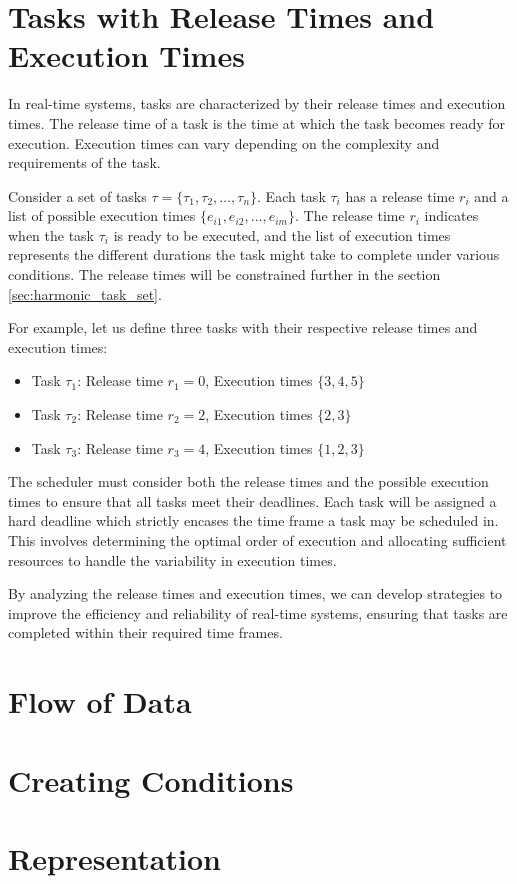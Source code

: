 \section{Tasks with Release Times and Execution Times}
\label{sec:tasks_release_execution}

In real-time systems, tasks are characterized by their release times and execution times.
The release time of a task is the time at which the task becomes ready for execution.
Execution times can vary depending on the complexity and requirements of the task.

Consider a set of tasks \( \tau = \{\tau_1, \tau_2, \ldots, \tau_n\} \).
Each task \( \tau_i \) has a release time \( r_i \) and a list of possible execution times \( \{e_{i1}, e_{i2}, \ldots, e_{im}\} \).
The release time \( r_i \) indicates when the task \( \tau_i \) is ready to be executed, and the list of execution times represents the different durations the task might take to complete under various conditions.
The release times will be constrained further in the section \cref{sec:harmonic_task_set}.

For example, let us define three tasks with their respective release times and execution times:

\begin{itemize}
	\item Task \( \tau_1 \): Release time \( r_1 = 0 \), Execution times \( \{3, 4, 5\} \)
	\item Task \( \tau_2 \): Release time \( r_2 = 2 \), Execution times \( \{2, 3\} \)
	\item Task \( \tau_3 \): Release time \( r_3 = 4 \), Execution times \( \{1, 2, 3\} \)
\end{itemize}

The scheduler must consider both the release times and the possible execution times to ensure that all tasks meet their deadlines.
Each task will be assigned a hard deadline which strictly encases the time frame a task may be scheduled in. 
This involves determining the optimal order of execution and allocating sufficient resources to handle the variability in execution times.

By analyzing the release times and execution times, we can develop strategies to improve the efficiency and reliability of real-time systems, ensuring that tasks are completed within their required time frames.

\section{Flow of Data}
\label{sec:flow_of_data}

\section{Creating Conditions}
\label{sec:creating_conditions}

\section{Representation}
\label{sec:representation}
